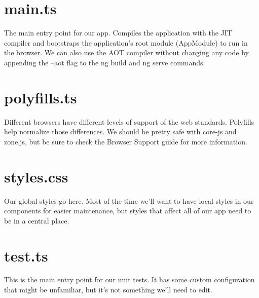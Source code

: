 \section{main.ts}
The main entry point for our app. Compiles the application with the JIT compiler and
bootstraps the application's root module (AppModule) to run in the browser. We can also use
the AOT compiler without changing any code by appending the --aot flag to the ng build and
ng serve commands.

\section{polyfills.ts}
Different browsers have different levels of support of the web standards. Polyfills help
normalize those differences. We should be pretty safe with core-js and zone.js, but be sure to
check the Browser Support guide for more information.

\section{styles.css}
Our global styles go here. Most of the time we'll want to have local styles in our components
for easier maintenance, but styles that affect all of our app need to be in a central place.

\section{test.ts}
This is the main entry point for our unit tests. It has some custom configuration that might be
unfamiliar, but it's not something we'll need to edit.